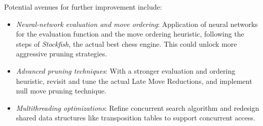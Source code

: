 \noindent Potential avenues for further improvement include:

\begin{itemize}[itemsep=1pt]
    \item \textit{Neural-network evaluation and move ordering}:  
    Application of neural networks for the evaluation function and the move ordering heuristic, following the steps of \textit{Stockfish}, the actual best chess engine. This could unlock more aggressive pruning strategies.
    \item \textit{Advanced pruning techniques}:  
    With a stronger evaluation and ordering heuristic, revisit and tune the actual Late Move Reductions, and implement null move pruning technique.
    \item \textit{Multithreading optimizations}:  
    Refine concurrent search algorithm and redesign shared data structures like transposition tables to support concurrent access.
\end{itemize}
